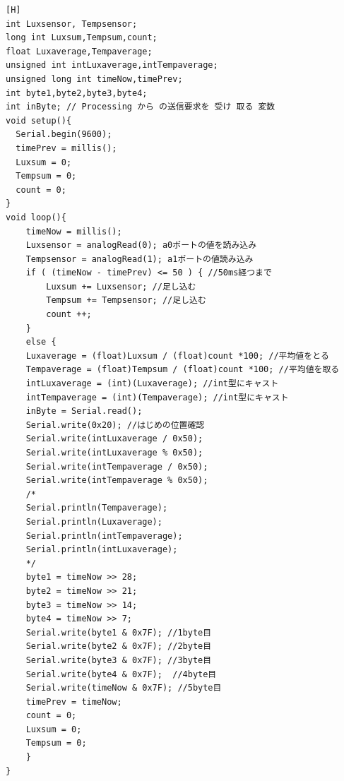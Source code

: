 \documentclass{jarticle}
\begin{document}
\begin{lstlisting}[caption = 課題4.1.4(Arduino),label=code:kadai4-1-4-a][H]
int Luxsensor, Tempsensor;
long int Luxsum,Tempsum,count;
float Luxaverage,Tempaverage;
unsigned int intLuxaverage,intTempaverage;
unsigned long int timeNow,timePrev;
int byte1,byte2,byte3,byte4;
int inByte; // Processing から の送信要求を 受け 取る 変数
void setup(){
  Serial.begin(9600);
  timePrev = millis();
  Luxsum = 0;
  Tempsum = 0;
  count = 0;
}
void loop(){
    timeNow = millis();
    Luxsensor = analogRead(0); a0ポートの値を読み込み
    Tempsensor = analogRead(1); a1ポートの値読み込み
    if ( (timeNow - timePrev) <= 50 ) { //50ms経つまで
        Luxsum += Luxsensor; //足し込む
        Tempsum += Tempsensor; //足し込む
        count ++;
    }
    else {
    Luxaverage = (float)Luxsum / (float)count *100; //平均値をとる
    Tempaverage = (float)Tempsum / (float)count *100; //平均値を取る
    intLuxaverage = (int)(Luxaverage); //int型にキャスト
    intTempaverage = (int)(Tempaverage); //int型にキャスト
    inByte = Serial.read();
    Serial.write(0x20); //はじめの位置確認
    Serial.write(intLuxaverage / 0x50);
    Serial.write(intLuxaverage % 0x50);
    Serial.write(intTempaverage / 0x50);
    Serial.write(intTempaverage % 0x50);
    /*
    Serial.println(Tempaverage);
    Serial.println(Luxaverage);
    Serial.println(intTempaverage);
    Serial.println(intLuxaverage);
    */
    byte1 = timeNow >> 28;
    byte2 = timeNow >> 21;
    byte3 = timeNow >> 14;
    byte4 = timeNow >> 7;
    Serial.write(byte1 & 0x7F); //1byte目
    Serial.write(byte2 & 0x7F); //2byte目
    Serial.write(byte3 & 0x7F); //3byte目
    Serial.write(byte4 & 0x7F);  //4byte目
    Serial.write(timeNow & 0x7F); //5byte目
    timePrev = timeNow;
    count = 0;
    Luxsum = 0;
    Tempsum = 0; 
    }
}
\end{lstlisting}
\end{document}
